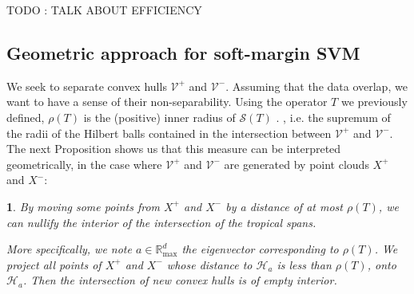 \documentclass[oneside,english,a4paper]{amsart}
\numberwithin{equation}{section}
\numberwithin{figure}{section}
\theoremstyle{plain}
\theoremstyle{definition}
\theoremstyle{plain}
\newtheorem{prop}[thm]{\protect\propositionname}
\theoremstyle{remark}
\theoremstyle{plain}
\theoremstyle{definition}
\theoremstyle{definition}
\providecommand{\propositionname}{Proposition}
\begin{document}
TODO : TALK ABOUT EFFICIENCY

\subsection{Geometric approach for soft-margin SVM}

We seek to separate convex hulls $\mathcal{V}^{+}$ and $\mathcal{V}^{-}$.
Assuming that the data overlap, we want to have a sense of their
non-separability. Using the operator $T$ we previously defined,  $\rho(T)$ is the
(positive) inner radius of $\mathcal{S}(T)$ . \cite{Allamigeon2018} , i.e. the supremum of
the radii of the Hilbert balls contained in the intersection between
$\mathcal{V}^{+}$ and $\mathcal{V}^{-}$. The next Proposition shows
us that this measure can be interpreted geometrically, in the case
where $\mathcal{V}^{+}$ and $\mathcal{V}^{-}$ are generated by point
clouds $X^{+}$ and $X^{-}$:
\begin{prop}
By moving some points from $X^{+}$ and $X^{-}$ by a distance of
at most $\rho(T)$, we can nullify the interior of the intersection
of the tropical spans.

More specifically, we note $a\in\mathbb{R}_{\max}^{d}$ the eigenvector
corresponding to $\rho(T)$. We project all points of $X^{+}$ and
$X^{-}$ whose distance to $\mathcal{H}_{a}$ is less than $\rho(T)$,
onto $\mathcal{H}_{a}$. Then the intersection of new convex hulls
is of empty interior.
\end{prop}
\end{document}
